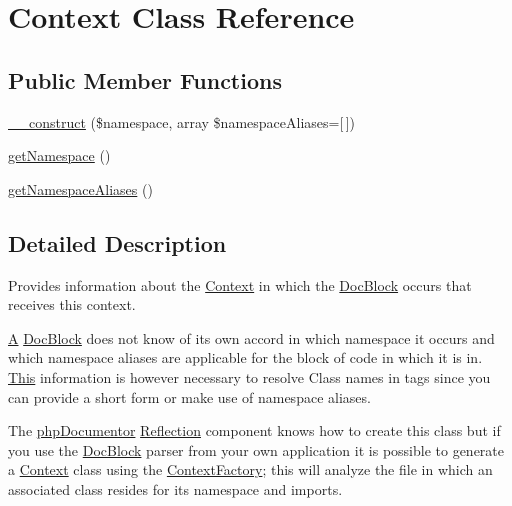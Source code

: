 \hypertarget{classphp_documentor_1_1_reflection_1_1_types_1_1_context}{}\section{Context Class Reference}
\label{classphp_documentor_1_1_reflection_1_1_types_1_1_context}
\subsection*{Public Member Functions}
\begin{DoxyCompactItemize}
\item 
\mbox{\hyperlink{classphp_documentor_1_1_reflection_1_1_types_1_1_context_aeb868e169fd10c9dcbcebc00b734b21b}{\+\_\+\+\_\+construct}} (\$namespace, array \$namespace\+Aliases=\mbox{[}$\,$\mbox{]})
\item 
\mbox{\hyperlink{classphp_documentor_1_1_reflection_1_1_types_1_1_context_a2614df64646ac71b70b1e1074258052b}{get\+Namespace}} ()
\item 
\mbox{\hyperlink{classphp_documentor_1_1_reflection_1_1_types_1_1_context_a71755ccbbbe1fb3ccd7446448d8e2e04}{get\+Namespace\+Aliases}} ()
\end{DoxyCompactItemize}


\subsection{Detailed Description}
Provides information about the \mbox{\hyperlink{classphp_documentor_1_1_reflection_1_1_types_1_1_context}{Context}} in which the \mbox{\hyperlink{classphp_documentor_1_1_reflection_1_1_doc_block}{Doc\+Block}} occurs that receives this context.

\mbox{\hyperlink{class_a}{A}} \mbox{\hyperlink{classphp_documentor_1_1_reflection_1_1_doc_block}{Doc\+Block}} does not know of its own accord in which namespace it occurs and which namespace aliases are applicable for the block of code in which it is in. \mbox{\hyperlink{classphp_documentor_1_1_reflection_1_1_types_1_1_this}{This}} information is however necessary to resolve Class names in tags since you can provide a short form or make use of namespace aliases.

The \mbox{\hyperlink{namespacephp_documentor}{php\+Documentor}} \mbox{\hyperlink{namespacephp_documentor_1_1_reflection}{Reflection}} component knows how to create this class but if you use the \mbox{\hyperlink{classphp_documentor_1_1_reflection_1_1_doc_block}{Doc\+Block}} parser from your own application it is possible to generate a \mbox{\hyperlink{classphp_documentor_1_1_reflection_1_1_types_1_1_context}{Context}} class using the \mbox{\hyperlink{classphp_documentor_1_1_reflection_1_1_types_1_1_context_factory}{Context\+Factory}}; this will analyze the file in which an associated class resides for its namespace and imports.

